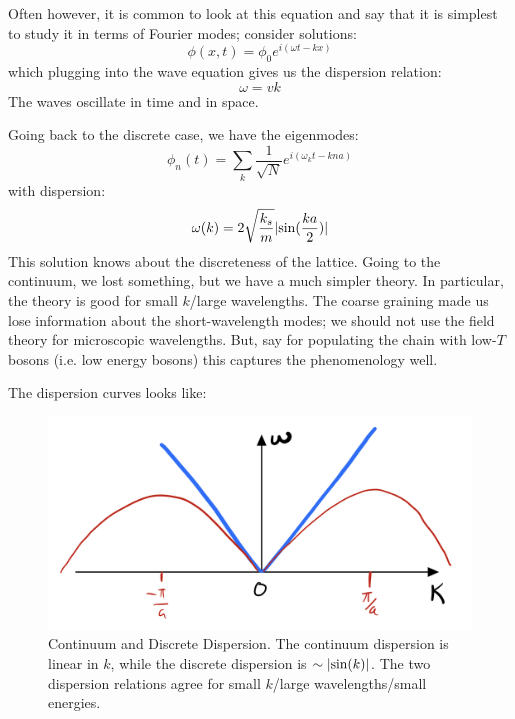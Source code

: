 Often however, it is common to look at this equation and say that it is simplest to study it in terms of Fourier modes; consider solutions:
\begin{equation}
    \phi(x, t) = \phi_0e^{i(\omega t - kx)}
\end{equation}
which plugging into the wave equation gives us the dispersion relation:
\begin{equation}
    \omega = vk
\end{equation}
The waves oscillate in time and in space.

Going back to the discrete case, we have the eigenmodes:
\begin{equation}
    \phi_n(t) = \sum_{k}\frac{1}{\sqrt{N}}e^{i(\omega_k t - k n a)}
\end{equation}
with dispersion:
\begin{equation}
    \omega(k) = 2\sqrt{\frac{k_s}{m}}\lvert \sin(\frac{k a}{2}) \rvert
\end{equation}
This solution knows about the discreteness of the lattice. Going to the continuum, we lost something, but we have a much simpler theory. In particular, the theory is good for small $k$/large wavelengths. The coarse graining made us lose information about the short-wavelength modes; we should not use the field theory for microscopic wavelengths. But, say for populating the chain with low-$T$ bosons (i.e. low energy bosons) this captures the phenomenology well. 

The dispersion curves looks like:
\begin{figure}[htbp]
    \centering
    \includegraphics[scale=0.4]{Lectures/Figures/Phonon_dispersion.png}
    \caption{Continuum and Discrete Dispersion. The continuum dispersion is linear in $k$, while the discrete dispersion is $\sim \lvert \sin(k) \rvert$. The two dispersion relations agree for small $k$/large wavelengths/small energies.}
    \label{fig:Phonon_dispersion}
\end{figure}

